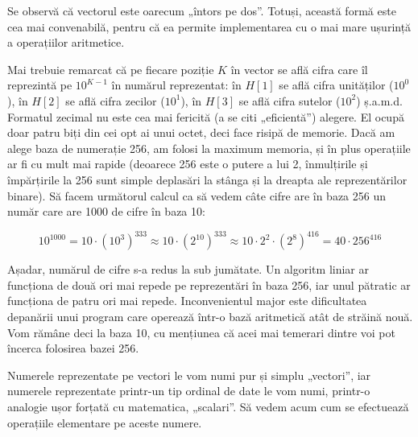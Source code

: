 
Se observă că vectorul este oarecum „întors pe dos”. Totuși, această formă
este cea mai convenabilă, pentru că ea permite implementarea cu o mai mare
ușurință a operațiilor aritmetice.

Mai trebuie remarcat că pe fiecare poziție $K$ în vector se află cifra care îl
reprezintă pe $10^{K-1}$ în numărul reprezentat: în $H[1]$ se află cifra
unităților ($10^0$), în $H[2]$ se află cifra zecilor ($10^1$), în $H[3]$ se
află cifra sutelor ($10^2$) ș.a.m.d. Formatul zecimal nu este cea mai fericită
(a se citi „eficientă”) alegere. El ocupă doar patru biți din cei opt ai unui
octet, deci face risipă de memorie. Dacă am alege baza de numerație 256, am
folosi la maximum memoria, și în plus operațiile ar fi cu mult mai rapide
(deoarece 256 este o putere a lui 2, înmulțirile și împărțirile la 256 sunt
simple deplasări la stânga și la dreapta ale reprezentărilor binare). Să facem
următorul calcul ca să vedem câte cifre are în baza 256 un număr care are 1000
de cifre în baza 10:

\begin{equation}
  10^{1000} =
  10 \cdot (10^3)^{333} \approx
  10 \cdot (2^{10})^{333} \approx
  10 \cdot 2^2 \cdot (2^8)^{416} =
  40 \cdot 256^{416}
\end{equation}
	
Așadar, numărul de cifre s-a redus la sub jumătate. Un algoritm liniar ar
funcționa de două ori mai repede pe reprezentări în baza 256, iar unul
pătratic ar funcționa de patru ori mai repede. Inconvenientul major este
dificultatea depanării unui program care operează într-o bază aritmetică atât
de străină nouă. Vom rămâne deci la baza 10, cu mențiunea că acei mai temerari
dintre voi pot încerca folosirea bazei 256.

Numerele reprezentate pe vectori le vom numi pur și simplu „vectori”, iar
numerele reprezentate printr-un tip ordinal de date le vom numi, printr-o
analogie ușor forțată cu matematica, „scalari”. Să vedem acum cum se
efectuează operațiile elementare pe aceste numere.

